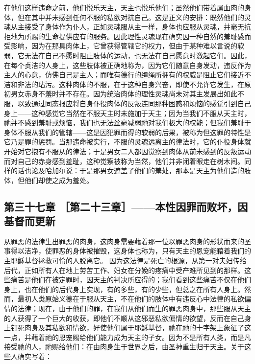 在他们这样违命之前，他们悦乐天主，天主也悦乐他们；虽然他们带着属血肉的身体，但在其中并未感到任何不服的私欲对抗自己。这是正义的安排：既然他们的灵魂从主接受了身体作为仆人，正如灵魂服从主一样，身体也应服从灵魂，并毫无抗拒地为所赐的生命提供应有的服务。因此理性灵魂现在确实因一种自然的羞耻感而受影响，因为在那具肉体上，它曾获得管辖它的权力，但由于某种难以言说的软弱，它无法在自己不愿时阻止肢体的运动，也无法在自己愿意时激起它们。因此，在每个贞洁的人身上，这些肢体被正确地称为，因为它们随意自身发动，违反作为主人的心意，仿佛自己是主人；而唯有德行的缰绳所拥有的权威是阻止它们接近不洁和非法的玷污。这种肉体的不服，在于这种自身兴奋，即使不允许它发生，在原初男女赤身不羞时并不存在。因为统治肉体的理性灵魂尚未对其主发展出如此不服，以致通过同态报应将自身仆役肉体的反叛连同那种困惑和烦恼的感觉引到自己身上——这种感觉它当然在不服天主时未施加于天主；因为当我们不服从天主时，祂并不感到羞耻或烦恼，我们也无法丝毫减弱祂对我们极大的权能；但我们羞耻于身体不服从我们的管辖——这是因犯罪而得的软弱的后果，被称为但这罪的特性是它乃是罪的惩罚。当那违命被实行，不服的灵魂远离主的律法时，它的仆役身体就开始对它抱有不服从的律法；于是男女二人都因觉察到肉体从前未感到的反叛运动而对自己的赤身感到羞耻，这种觉察被称为当然，他们并非闭着眼走在树木间。同样的话也论及哈加尔说：于是那男女遮盖了他们的羞处，那本是天主为他们造的肢体，但他们却使之成为羞处。\par


\subsection{第三十七章 ［第二十三章］——本性因罪而败坏，因基督而更新}

从罪恶的法律生出罪恶的肉身，这肉身需要藉着那一位以罪恶肉身的形状而来的圣事得以洁净，使罪恶的身体被摧毁，这身体也称为，只有天主的恩宠能藉着我们的主耶稣基督拯救可怜的人脱离它。 因为这法律是死亡的根源，从第一对夫妇传给后代，正如所有人在地上劳苦工作、妇女在分娩的疼痛中受产难所见到的那样。这些痛苦是他们在被定罪时，因天主的判决所应得的；我们看到这些痛苦不仅在他们身上，也在他们的后代身上实现，有的多些，有的少些，但总之在所有人身上。然而，最初人类原始义德在于服从天主，不在他们的肢体中有违反心中法律的私欲偏情的法律；现在，由于他们的罪，在我们从他们而生的罪恶肉身中，那些服从天主的人获得了一个巨大的收获，即他们不顺从这邪恶私欲偏情的欲望，反而在自己身上钉死肉身及其私欲和情欲，好使他们属于耶稣基督，祂在祂的十字架上象征了这一点，并藉着祂的恩宠赐给他们能力成为天主的子女。因为不是所有人类，而是凡接受祂的人，祂赐给他们：在由肉身生于世界之后，由圣神重生归于天主。关于这些人确实写着：\par

